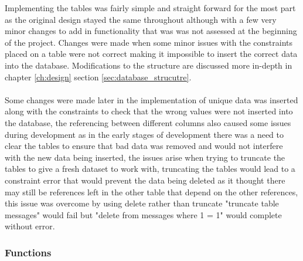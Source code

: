 Implementing the tables was fairly simple and straight forward for the most part as the original design stayed the same throughout although with a few very minor changes to add in functionality that was was not assessed at the beginning of the project. Changes were made when some minor issues with the constraints placed on a table were not correct making it impossible to insert the correct data into the database. Modifications to the structure are discussed more in-depth in chapter \ref{ch:design} section \ref{sec:database_strucutre}.\\
\\
Some changes were made later in the implementation of unique data was inserted along with the constraints to check that the wrong values were not inserted into the database, the referencing between different columns also caused some issues during development as in the early stages of development there was a need to clear the tables to ensure that bad data was removed and would not interfere with the new data being inserted, the issues arise when trying to truncate the tables to give a fresh dataset to work with, truncating the tables would lead to a constraint error that would prevent the data being deleted as it thought there may still be references left in the other table that depend on the other references, this issue was overcome by using delete rather than truncate "truncate table messages" would fail but "delete from messages where 1 = 1" would complete without error.

\subsubsection{Functions}


